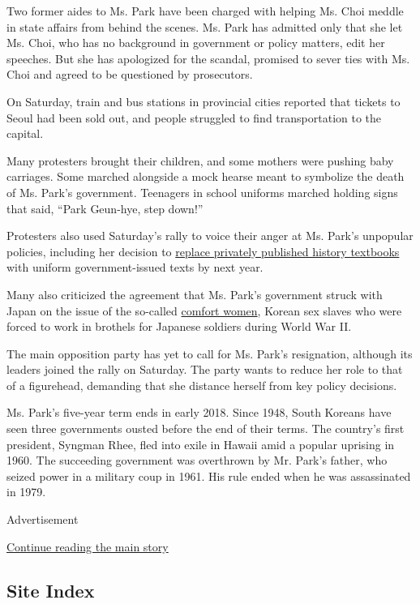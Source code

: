 Two former aides to Ms. Park have been charged with helping Ms. Choi
meddle in state affairs from behind the scenes. Ms. Park has admitted
only that she let Ms. Choi, who has no background in government or
policy matters, edit her speeches. But she has apologized for the
scandal, promised to sever ties with Ms. Choi and agreed to be
questioned by prosecutors.

On Saturday, train and bus stations in provincial cities reported that
tickets to Seoul had been sold out, and people struggled to find
transportation to the capital.

Many protesters brought their children, and some mothers were pushing
baby carriages. Some marched alongside a mock hearse meant to symbolize
the death of Ms. Park's government. Teenagers in school uniforms marched
holding signs that said, ``Park Geun-hye, step down!''

Protesters also used Saturday's rally to voice their anger at Ms. Park's
unpopular policies, including her decision to
\href{http://www.nytimes.com/2015/10/13/world/asia/south-korea-to-issue-state-history-textbooks-rejecting-private-publishers.html}{replace
privately published history textbooks} with uniform government-issued
texts by next year.

Many also criticized the agreement that Ms. Park's government struck
with Japan on the issue of the so-called
\href{http://www.nytimes.com/2015/12/29/world/asia/comfort-women-south-korea-japan.html}{comfort
women}, Korean sex slaves who were forced to work in brothels for
Japanese soldiers during World War II.

The main opposition party has yet to call for Ms. Park's resignation,
although its leaders joined the rally on Saturday. The party wants to
reduce her role to that of a figurehead, demanding that she distance
herself from key policy decisions.

Ms. Park's five-year term ends in early 2018. Since 1948, South Koreans
have seen three governments ousted before the end of their terms. The
country's first president, Syngman Rhee, fled into exile in Hawaii amid
a popular uprising in 1960. The succeeding government was overthrown by
Mr. Park's father, who seized power in a military coup in 1961. His rule
ended when he was assassinated in 1979.

Advertisement

\protect\hyperlink{after-bottom}{Continue reading the main story}

\hypertarget{site-index}{%
\subsection{Site Index}\label{site-index}}

